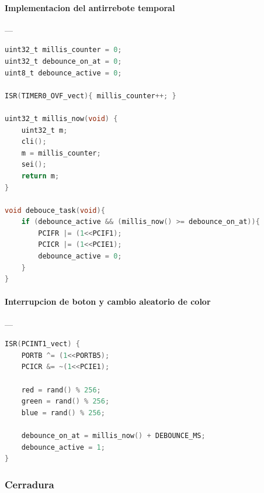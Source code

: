 \paragraph{Implementacion del antirrebote temporal}\label{anexo:MA6_debounce_task}---\\
\begin{lstlisting}[language=C, caption={Antirrebote mediante temporizacion usando Timer0 y variables globales.}]
uint32_t millis_counter = 0;
uint32_t debounce_on_at = 0;
uint8_t debounce_active = 0;

ISR(TIMER0_OVF_vect){ millis_counter++; }

uint32_t millis_now(void) {
    uint32_t m;
    cli();
    m = millis_counter;
    sei();
    return m;
}

void debouce_task(void){
    if (debounce_active && (millis_now() >= debounce_on_at)){
        PCIFR |= (1<<PCIF1);
        PCICR |= (1<<PCIE1);
        debounce_active = 0;
    }
}
\end{lstlisting}

\paragraph{Interrupcion de boton y cambio aleatorio de color}\label{anexo:MA7_pcint_color}---\\
\begin{lstlisting}[language=C, caption={Interrupcion por cambio de estado para generar color aleatorio.}]
ISR(PCINT1_vect) {
    PORTB ^= (1<<PORTB5);
    PCICR &= ~(1<<PCIE1);
    
    red = rand() % 256;
    green = rand() % 256;
    blue = rand() % 256;
    
    debounce_on_at = millis_now() + DEBOUNCE_MS;
    debounce_active = 1;
}
\end{lstlisting}

\subsubsection{Cerradura}


